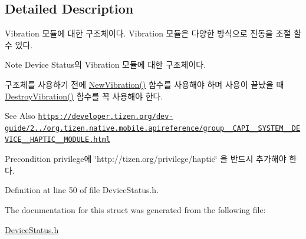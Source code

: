 \subsection{Detailed Description}
Vibration 모듈에 대한 구조체이다. Vibration 모듈은 다양한 방식으로 진동을 조절 할 수 있다. 

\begin{DoxyNote}{Note}
Device Status의 Vibration 모듈에 대한 구조체이다. \par
 구조체를 사용하기 전에 \hyperlink{DeviceStatus_8h_a9c3d84ca51a859ceb9eaa0097fa14266}{New\-Vibration()} 함수를 사용해야 하며 사용이 끝났을 때 \hyperlink{DeviceStatus_8h_a336e3f65421006097670aec144c07e4a}{Destroy\-Vibration()} 함수를 꼭 사용해야 한다. 
\end{DoxyNote}
\begin{DoxySeeAlso}{See Also}
\href{https://developer.tizen.org/dev-guide/2.3.0/org.tizen.native.mobile.apireference/group__CAPI__SYSTEM__DEVICE__HAPTIC__MODULE.html}{\tt https\-://developer.\-tizen.\-org/dev-\/guide/2../org.\-tizen.\-native.\-mobile.\-apireference/group\-\_\-\-\_\-\-C\-A\-P\-I\-\_\-\-\_\-\-S\-Y\-S\-T\-E\-M\-\_\-\-\_\-\-D\-E\-V\-I\-C\-E\-\_\-\-\_\-\-H\-A\-P\-T\-I\-C\-\_\-\-\_\-\-M\-O\-D\-U\-L\-E.\-html} 
\end{DoxySeeAlso}
\begin{DoxyPrecond}{Precondition}
privilege에 \char`\"{}http\-://tizen.\-org/privilege/haptic\char`\"{} 을 반드시 추가해야 한다. 
\end{DoxyPrecond}


Definition at line 50 of file Device\-Status.\-h.



The documentation for this struct was generated from the following file\-:\begin{DoxyCompactItemize}
\item 
\hyperlink{DeviceStatus_8h}{Device\-Status.\-h}\end{DoxyCompactItemize}
